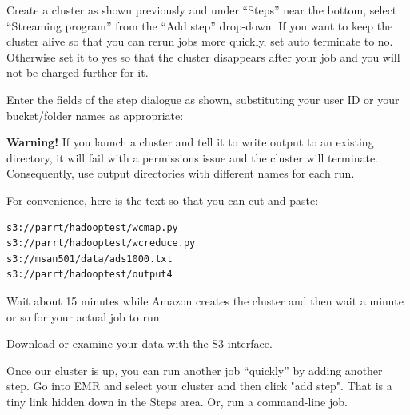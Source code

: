 \begin{fullwidth}
\step Create a cluster as shown previously and under ``Steps'' near the bottom, select ``Streaming program'' from the ``Add step'' drop-down. If you want to keep the cluster alive so that you can rerun jobs more quickly, set auto terminate to no. Otherwise set it to yes so that the cluster disappears after your job and you will not be charged further for it. 

\step Enter the fields of the step dialogue as shown, substituting your user ID or your bucket/folder names as appropriate:

\noindent{}

{\bf Warning!} If you launch a cluster and tell it to write output to an existing directory, it will fail with a permissions issue and the cluster will terminate.  Consequently, use output directories with different names for each run.

For convenience, here is the text so that you can cut-and-paste:

\begin{lstlisting}[style=BashInputStyle]
s3://parrt/hadooptest/wcmap.py
s3://parrt/hadooptest/wcreduce.py
s3://msan501/data/ads1000.txt
s3://parrt/hadooptest/output4
\end{lstlisting}

\step Wait about 15 minutes while Amazon creates the cluster and then wait a minute or so for your actual job to run.

\step Download or examine your data with the S3 interface.

Once our cluster is up, you can run another job ``quickly'' by adding another step. Go into EMR and select your cluster and then click "add step". That is a tiny link hidden down in the Steps area.  Or, run a command-line job.


\end{fullwidth}
